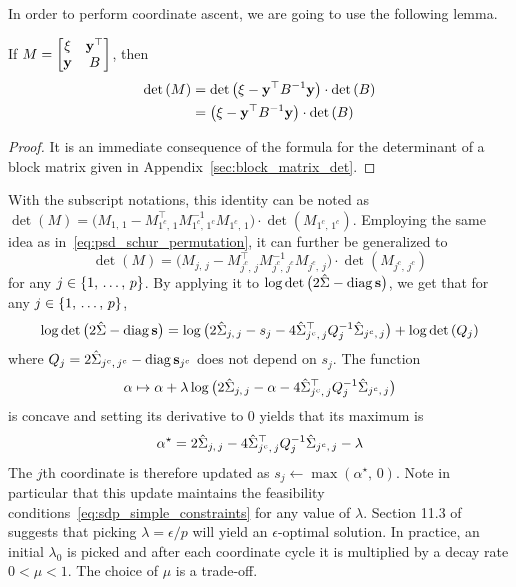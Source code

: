 In order to perform coordinate ascent, we are going to use the following lemma.
\begin{lemma}
    If $M = \begin{bmatrix}
        \xi & \mathbf{y}^\top\\
        \mathbf{y} & B
    \end{bmatrix}$,
    then
    \begin{align*}
        \det\left( M \right) &= \det\big( \xi - \mathbf{y}^\top B^{-1} \mathbf{y} \big) \cdot \det\left( B \right)\\
        &= \big( \xi - \mathbf{y}^\top B^{-1} \mathbf{y} \big) \cdot \det\left( B \right)
    \end{align*}
\end{lemma}
\begin{proof}
    It is an immediate consequence of the formula for the determinant of a block matrix
    given in Appendix~\ref{sec:block_matrix_det}.
\end{proof}
With the subscript notations, this identity can be noted as
$\det\left( M \right) = \big( M_{1,\, 1} - M_{1^c,\, 1}^\top M_{1^c,\, 1^c}^{-1} M_{1^c,\, 1} \big)
    \cdot\det\left( M_{1^c,\, 1^c} \right)$.
Employing the same idea as in~\ref{eq:psd_schur_permutation},
it can further be generalized to
\begin{equation*}
    \det\left( M \right) = \big( M_{j,\, j} - M_{j^c,\, j}^\top M_{j^c,\, j^c}^{-1} M_{j^c,\, j} \big)
        \cdot\det\left( M_{j^c,\, j^c} \right)
\end{equation*}
for any $j \in \left\{ 1,\, \dots,\, p \right\}$.
\bigbreak
By applying it to $\log\det\big( 2\hat{\Sigma} - \operatorname*{diag}\mathbf{s} \big)$,
we get that for any $j \in \left\{ 1,\, \dots,\, p \right\}$,
\begin{equation*}
    \log\det\big( 2\hat{\Sigma} - \operatorname*{diag}\mathbf{s} \big) =
        \log\big( 2\hat{\Sigma}_{j,\, j} - s_j - 4\hat{\Sigma}_{j^c,\, j}^\top Q_j^{-1} \hat{\Sigma}_{j^c,\, j} \big)
            + \log\det\left( Q_j \right)
\end{equation*}
where $Q_j = 2\hat{\Sigma}_{j^c,\, j^c} - \operatorname*{diag}\mathbf{s}_{j^c}$ does not depend on $s_j$.
The function
\begin{equation*}
    \alpha \mapsto \alpha
        + \lambda\log\big( 2\hat{\Sigma}_{j,\, j} - \alpha - 4\hat{\Sigma}_{j^c,\, j}^\top Q_j^{-1} \hat{\Sigma}_{j^c,\, j} \big)
\end{equation*}
is concave and setting its derivative to $0$ yields that its maximum is
\begin{equation*}
    \alpha^\star = 2\hat{\Sigma}_{j,\, j} - 4\hat{\Sigma}_{j^c,\, j}^\top Q_j^{-1} \hat{\Sigma}_{j^c,\, j} - \lambda
\end{equation*}
The $j$th coordinate is therefore updated as $s_j \leftarrow \max\left( \alpha^\star,\, 0 \right)$.
Note in particular that this update maintains the feasibility
conditions~\ref{eq:sdp_simple_constraints} for any value of $\lambda$.
Section 11.3 of~\cite{convex_optimization} suggests that picking $\lambda = \epsilon / p$ will yield an
$\epsilon$-optimal solution.
In practice, an initial $\lambda_0$ is picked and after each coordinate cycle it is multiplied by a decay rate
$0 < \mu < 1$.
The choice of $\mu$ is a trade-off.

